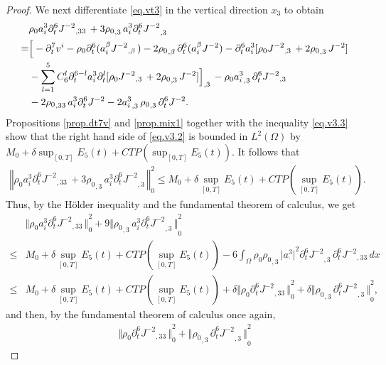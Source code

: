 \documentclass[12pt,twoside,reqno]{amsart}
\numberwithin{equation}{section}
\theoremstyle{definition}
\theoremstyle{remark}
\begin{document}
\begin{proof}
We next differentiate \eqref{eq.vt3} in the vertical direction $x_3$ to obtain
\begin{align}\label{eq.v3.2}
  &{\rho_0}  a_i^3 {\partial}_t^6{{{J^{-2}}}_{,{33}}\,}+3{{\rho_0}_{,{3}}\,} a_i^3 {{{{\partial}_t^6 J^{-2}}}_{,{3}}\,}{\nonumber}\\
    =&\Big[-{\partial}_t^7v^i-{\rho_0}  {\partial}_t^6(a_i^\beta{{{J^{-2}}}_{,{\beta}}\,})-2 {{\rho_0}_{,{\beta}}\,} {\partial}_t^6(a_i^\beta J^{-2})-{\partial}_t^6 a_i^3[ {\rho_0}  {{{J^{-2}}}_{,{3}}\,}+2 {{\rho_0}_{,{3}}\,}J^{-2}]{\nonumber}\\
    &-\sum_{l=1}^5 C_6^l{\partial}_t^{6-l} a_i^3{\partial}_t^l[ {\rho_0}  {{{J^{-2}}}_{,{3}}\,}+2 {{\rho_0}_{,{3}}\,}J^{-2}]{{{\Big]}}_{,{3}}\,} -{\rho_0}  {{{a_i^3}}_{,{3}}\,} {\partial}_t^6{{{J^{-2}}}_{,{3}}\,}{\nonumber}\\
    &-2{{\rho_0}_{,{33}}\,} a_i^3{\partial}_t^6 J^{-2}-2 {{{a_i^3}}_{,{3}}\,}{{\rho_0}_{,{3}}\,}{\partial}_t^6 J^{-2}.
\end{align}
Propositions \ref{prop.dt7v} and \ref{prop.mix1} together with the inequality \eqref{eq.v3.3} show that the right hand side of \eqref{eq.v3.2} is bounded in $L^2(\Omega)$ by $M_0+\delta \sup_{[0,T]} E_5(t)+CTP(\sup_{[0,T]}E_5(t))$. It follows that
\begin{align*}
  {\left\Vert{{\rho_0}  a_i^3 {\partial}_t^6{{{J^{-2}}}_{,{33}}\,}+3{{\rho_0}_{,{3}}\,} a_i^3 {{{{\partial}_t^6 J^{-2}}}_{,{3}}\,}}\right\Vert}_0^2{\leqslant} M_0+\delta \sup_{[0,T]} E_5(t)+CTP(\sup_{[0,T]}E_5(t)).
\end{align*}
Thus, by the H\"older inequality and the fundamental theorem of calculus, we get
\begin{align*}
  &{\Vert{{\rho_0}  a_i^3 {\partial}_t^6{{{J^{-2}}}_{,{33}}\,}}\Vert}_0^2+9{\Vert{{{\rho_0}_{,{3}}\,} a_i^3 {{{{\partial}_t^6 J^{-2}}}_{,{3}}\,}}\Vert}_0^2\\
  {\leqslant}& M_0+\delta \sup_{[0,T]} E_5(t)+CTP(\sup_{[0,T]}E_5(t))-6\int_\Omega{\rho_0}  {{\rho_0}_{,{3}}\,} {\vert{a_\cdot^3}\vert}^2{{{{\partial}_t^6 J^{-2}}}_{,{3}}\,}{\partial}_t^6{{{J^{-2}}}_{,{33}}\,}dx\\
  {\leqslant} &M_0+\delta \sup_{[0,T]} E_5(t)+CTP(\sup_{[0,T]}E_5(t))+\delta {\Vert{{\rho_0}  {\partial}_t^6{{{J^{-2}}}_{,{33}}\,} }\Vert}_0^2+\delta{\Vert{{{\rho_0}_{,{3}}\,}{{{{\partial}_t^6 J^{-2}}}_{,{3}}\,}}\Vert}_0^2,
\end{align*}
and then, by the fundamental theorem of calculus once again,
\begin{align*}
  {\Vert{{\rho_0}  {\partial}_t^6{{{J^{-2}}}_{,{33}}\,}}\Vert}_0^2+{\Vert{{{\rho_0}_{,{3}}\,} {{{{\partial}_t^6 J^{-2}}}_{,{3}}\,}}\Vert}_0^2

\end{align*}
\end{proof}
\end{document}
